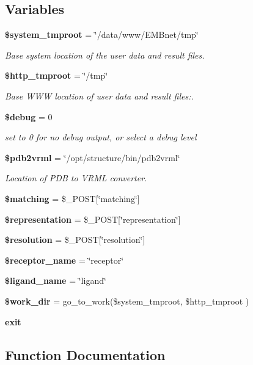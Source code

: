 \subsection*{Variables}
\begin{CompactItemize}
\item 
{\bf \$system\_\-tmproot} = \char`\"{}/data/www/EMBnet/tmp\char`\"{}
\begin{CompactList}\small\item\em Base system location of the user data and result files. \item\end{CompactList}\item 
{\bf \$http\_\-tmproot} = \char`\"{}/tmp\char`\"{}
\begin{CompactList}\small\item\em Base WWW location of user data and result files:. \item\end{CompactList}\item 
{\bf \$debug} = 0
\begin{CompactList}\small\item\em set to 0 for no debug output, or select a debug level \item\end{CompactList}\item 
{\bf \$pdb2vrml} = \char`\"{}/opt/structure/bin/pdb2vrml\char`\"{}
\begin{CompactList}\small\item\em Location of PDB to VRML converter. \item\end{CompactList}\item 
{\bf \$matching} = \$\_\-POST[\char`\"{}matching\char`\"{}]
\item 
{\bf \$representation} = \$\_\-POST[\char`\"{}representation\char`\"{}]
\item 
{\bf \$resolution} = \$\_\-POST[\char`\"{}resolution\char`\"{}]
\item 
{\bf \$receptor\_\-name} = \char`\"{}receptor\char`\"{}
\item 
{\bf \$ligand\_\-name} = \char`\"{}ligand\char`\"{}
\item 
{\bf \$work\_\-dir} = go\_\-to\_\-work(\$system\_\-tmproot, \$http\_\-tmproot )
\item 
{\bf exit}
\end{CompactItemize}


\subsection{Function Documentation}
